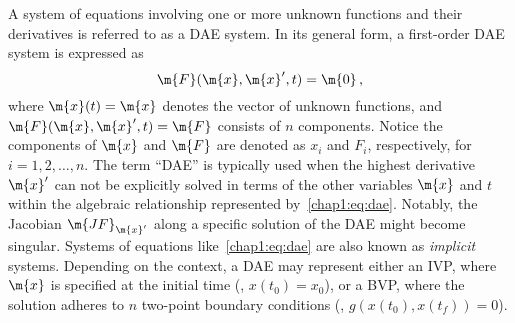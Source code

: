 A system of equations involving one or more unknown functions and their derivatives is referred to as a \ac{DAE} system. In its general form, a first-order \ac{DAE} system is expressed as
%
\begin{equation}
  \m{F}(\m{x}, \m{x}^{\prime}, t) = \m{0} \, \text{,}
  \label{chap1:eq:dae}
\end{equation}
%
where $\m{x}(t) = \m{x}$ denotes the vector of unknown functions, and $\m{F}(\m{x}, \m{x}^{\prime}, t) = \m{F}$ consists of $n$ components. Notice the components of $\m{x}$ and $\m{F}$ are denoted as $x_i$ and $F_i$, respectively, for $i = 1, 2, \dots, n$. The term ``\ac{DAE}'' is typically used when the highest derivative $\m{x}^{\prime}$ can not be explicitly solved in terms of the other variables $\m{x}$ and $t$ within the algebraic relationship represented by~\eqref{chap1:eq:dae}. Notably, the Jacobian $\m{JF}_{\m{x}^{\prime}}$ along a specific solution of the \ac{DAE} might become singular. Systems of equations like~\eqref{chap1:eq:dae} are also known as \emph{implicit} systems. Depending on the context, a \ac{DAE} may represent either an \ac{IVP}, where $\m{x}$ is specified at the initial time (\eg{}, $x(t_0) = x_0$), or a \ac{BVP}, where the solution adheres to $n$ two-point boundary conditions (\eg{}, $g(x(t_0), x(t_f)) = 0$).

